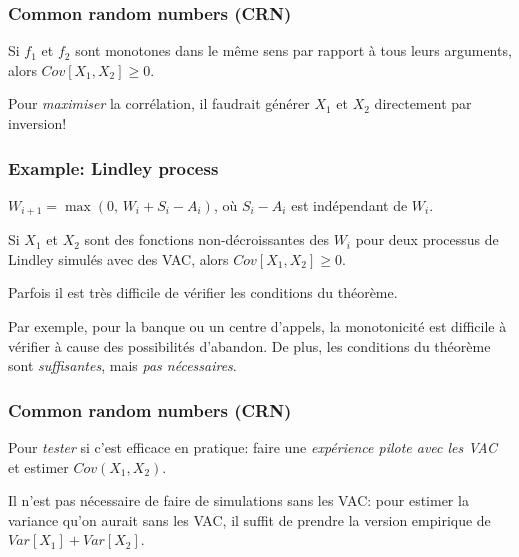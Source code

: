 \documentclass[t,usepdftitle=false]{beamer}
\begin{document}
\begin{frame}
	\frametitle{Common random numbers (CRN)}
	
	\begin{theorem}
		Si $f_1$ et $f_2$ sont monotones dans le m\^eme sens par rapport \`a
		tous leurs arguments, alors  $Cov[X_1, X_2] \ge 0$.
	\end{theorem}
	
	\mbox{}
	
	Pour \emph{maximiser} la corrélation, il faudrait générer
	$X_1$ et $X_2$ directement par inversion!
	
\end{frame}

\begin{frame}
	\frametitle{Example: Lindley process}
	
	${W_{i+1}} = \max(0,\, W_i + S_i - A_i)$, o\`u $S_i-A_i$ est
	indépendant de $W_i$.
	
	\mbox{}
	
	Si ${X_1}$ et ${X_2}$ sont des fonctions non-décroissantes des $W_i$
	pour deux processus de Lindley simulés avec des VAC, 
	alors $Cov[X_1, X_2] \ge 0$.
	
	\mbox{}
	
	Parfois il est très difficile de vérifier les conditions du
	théorème.
	
	\mbox{}
	
	Par exemple, pour la banque ou un centre d'appels, la monotonicité
	est difficile \`a vérifier \`a cause des possibilités d'abandon.
	De plus, les conditions du théorème sont \emph{suffisantes}, mais 
	\emph{pas nécessaires}.
	
\end{frame}

\begin{frame}
	\frametitle{Common random numbers (CRN)}
	
	Pour \emph{tester} si c'est efficace en pratique:
	faire une \emph{expérience pilote avec les VAC} et estimer 
	$Cov(X_1, X_2)$.
	
	\mbox{}
	
	Il n'est pas nécessaire de faire de simulations sans les VAC:
	pour estimer la variance qu'on aurait sans les VAC,
	il suffit de prendre la version empirique de $Var[X_1] + Var[X_2]$.
	
\end{frame}
\end{document}
